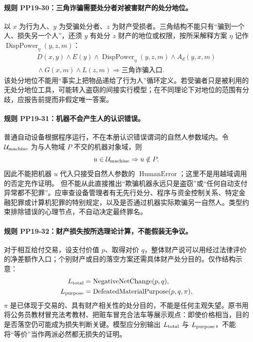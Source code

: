 \paragraph{规则 PP19-30：三角诈骗需要处分者对被害财产的处分地位。}
\mbox{}\par
以 $x$ 为行为人、$y$ 为受骗处分者、$z$ 为财产受损者。三角结构不能只有“骗到一个人、损失另一个人”，还须 $y$ 有处分 $z$ 财产的地位或权限，按所采解释方案 $\eta$ 记作 $\operatorname{DispPower}_{\eta}(y,z,m)$：
\[
\begin{aligned}
D(x,y)\land E(y)\land\operatorname{DispPower}_{\eta}(y,z,m)
\land A_d(y,x,m)\\
{}\land G(x,m)\land L(z,m)
\Rightarrow\text{三角诈骗入口}.
\end{aligned}
\]
该处分地位不能用“事实上把物品递给了行为人”循环定义。若受骗者只是被利用的无处分地位工具，可能转入盗窃的间接实行模型；在不同理论下对地位的范围有分歧，应报告前提而非假定唯一答案。

\paragraph{规则 PP19-31：机器不会产生人的认识错误。}
\mbox{}\par
普通自动设备根据程序运行，不在本册认识错误谓词的自然人参数域内。令 $\mathcal U_{\rm machine}$ 为与人物域 $P$ 不交的机器对象域，则
\[
u\in\mathcal U_{\rm machine}\Rightarrow u\notin P.
\]
因此不能把机器 $u$ 代入只接受自然人参数的 $\operatorname{HumanError}$；这里不是用越域调用的否定充作证明。
但不能从此直接推出“欺骗机器永远只是盗窃”或“任何自动支付异常都不犯罪”。应审查设备管理者有无先行处分、程序与资金控制关系、特定金融犯罪或计算机犯罪的特别规定，以及是否通过机器实际欺骗另一自然人。类型约束排除错误的心理节点，不自动决定最终罪名。

\paragraph{规则 PP19-32：财产损失按所选理论计算，不能假装无争议。}
\mbox{}\par
对于相互给付交易，设支付价值 $p$、取得对价 $q$，整体财产说可以用经过法律评价的净差额作入口；个别财产或目的落空方案还需具体财产处分目的。仅作结构示意：
\[
\begin{aligned}
L_{\rm total}&=\operatorname{NegativeNetChange}(p,q),\\
L_{\rm purpose}&=\operatorname{DefeatedMaterialPurpose}(p,q,\pi),
\end{aligned}
\]
$\pi$ 是已体现于交易的、具有财产相关性的处分目的，不能是任何主观失望。原书用将公务员教材冒充法考教材、把赃车冒充合法车等展示观点：即使价格相当，目的是否落空仍可能成为损失判断关键。模型应分别输出 $L_{\rm total}$ 与 $L_{\rm purpose}$，不能将“等价”当作两派必然都无损失的证明。

